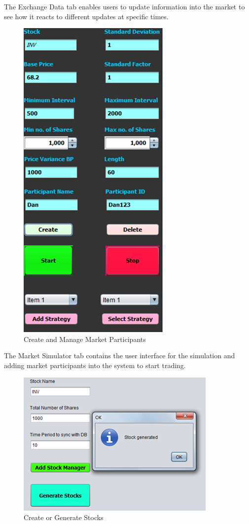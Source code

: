 \documentclass[12pt]{article}
\begin{document}
The Exchange Data tab enables users to update information into the market to see how it reacts to different updates at specific times.           
\begin{figure}[h!]
\centering
\includegraphics[scale=0.8]{./marketparticipant}
\caption{Create and Manage Market Participants}
\label{Market Participants}
\end{figure}
        
The Market Simulator tab contains the user interface for the simulation and adding market participants into the system to start trading.            

	\begin{figure}[h!]
	\centering
	\includegraphics[scale=0.8]{./createstocks}
	\caption{Create or Generate Stocks}
	\label{Stocks}
	\end{figure}
	
\end{document}
